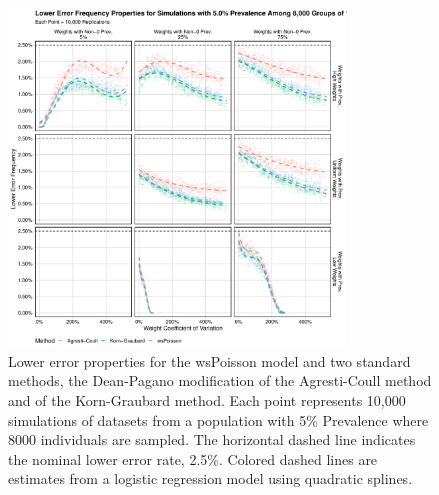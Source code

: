 \documentclass[AMA,STIX1COL]{WileyNJD-v2}
\begin{document}
\begin{figure}
\centering
\includegraphics[width=0.8\textwidth]{figures/perfect_lower_error_frequency_8000_groups_0_05_prev.pdf}
\caption{Lower error properties for the wsPoisson model and two standard methods, the Dean-Pagano modification of the Agresti-Coull method and of the Korn-Graubard method.
Each point represents 10,000 simulations of datasets from a population with 5\% Prevalence where 8000 individuals are sampled.
The horizontal dashed line indicates the nominal lower error rate, 2.5\%.
Colored dashed lines are estimates from a logistic regression model using quadratic splines.}
\label{fig:perfect_lower_error_frequency_8000_groups_0_05_prev}
\end{figure}
\end{document}
